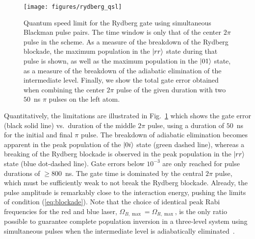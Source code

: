 \begin{figure}[tb]
  \begin{center}
    \texttt{[image: figures/rydberg\_qsl]}
  \end{center}
  \caption{%
    Quantum speed limit for the Rydberg gate using simultaneous
    Blackman pulse pairs. The time window is only that of the center
    $2 \pi$ pulse in the scheme.
    As a measure of the breakdown of the Rydberg blockade,
    the maximum population in the $\Ket{rr}$ state during that pulse is shown,
    as well as the maximum population in the $\Ket{01}$ state, as a measure of
    the breakdown of the adiabatic elimination of the intermediate level.
    Finally, we show the total gate error obtained when combining the center
    $2\pi$ pulse of the given duration with two $50$~ns $\pi$ pulses on the left
    atom.
  }
  \label{fig:QSL}
\end{figure}
Quantitatively, the limitations are illustrated in
Fig.~\ref{fig:QSL} which shows the gate error (black solid line) vs.\ duration
of the middle $2\pi$ pulse, using
a duration of $50$~ns for the initial and final $\pi$ pulse. 
The breakdown of adiabatic elimination becomes apparent in the peak
population of the $\Ket{0i}$ state (green dashed line), whereas a
breaking of the Rydberg blockade is observed in
the peak population in the $\Ket{rr}$ state (blue dot-dashed line).
Gate errors below $10^{-3}$ are only reached
for pulse durations of $\geq 800$~ns.
The gate time is dominated by the central $2\pi$ pulse, which must be
sufficiently weak to not break the Rydberg blockade. Already, the pulse
amplitude is remarkably close to the interaction energy, pushing the limits of
condition (\ref{eq:blockade}).
Note that the choice of identical
peak Rabi frequencies for the red and blue laser,
$\Omega_{B,\max}=\Omega_{R,\max}$, is the only ratio
possible to guarantee complete population inversion in a three-level
system using simultaneous pulses when the intermediate level is adiabatically
eliminated~\cite{ShoreBook11}.

